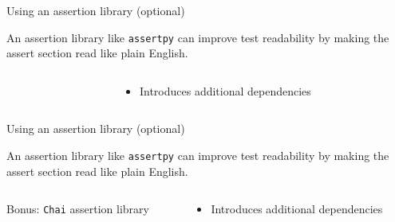 \documentclass[english,10pt,aspectratio=169,t]{beamer}
\begin{document}
\begin{frame}{Using an assertion library (optional)}
  \begin{minipage}{\textwidth}
    An assertion library like \texttt{assertpy} can improve test readability by
    making the assert section read like plain English.
  \end{minipage}
  \begin{columns}[T]
    \begin{column}{0.5\textwidth}
      \begin{minipage}{\textwidth}
        \assertionlibrary
      \end{minipage}
    \end{column}
    \begin{column}{0.5\textwidth}
      \begin{itemize}
        \item Introduces additional dependencies
      \end{itemize}
    \end{column}
  \end{columns}
\end{frame}

\begin{frame}{Using an assertion library (optional)}
  \begin{minipage}{\textwidth}
    An assertion library like \texttt{assertpy} can improve test readability by
    making the assert section read like plain English.
  \end{minipage}
  \begin{columns}[T]
    \begin{column}{0.5\textwidth}
      \begin{minipage}{\textwidth}
        \assertionlibrary

        Bonus: \texttt{Chai} assertion library
        \chailibrary
      \end{minipage}
    \end{column}
    \begin{column}{0.5\textwidth}
      \begin{itemize}
        \item Introduces additional dependencies
      \end{itemize}
    \end{column}
  \end{columns}
\end{frame}
\end{document}
